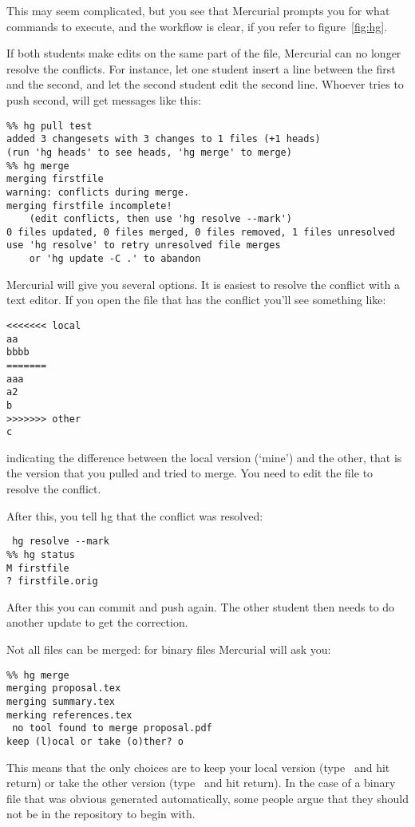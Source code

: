 This may seem complicated, but you see that Mercurial prompts you 
for what commands to execute, and the workflow is clear, if you refer
to figure~\ref{fig:hg}.


If both students make edits on the same part of the file, Mercurial can no
longer resolve the conflicts. For instance, let one student insert a
line between the first and the second, and let the second student edit
the second line. Whoever tries to push second, will get messages
like this:
{\small
\begin{verbatim}
%% hg pull test
added 3 changesets with 3 changes to 1 files (+1 heads)
(run 'hg heads' to see heads, 'hg merge' to merge)
%% hg merge
merging firstfile
warning: conflicts during merge.
merging firstfile incomplete! 
    (edit conflicts, then use 'hg resolve --mark')
0 files updated, 0 files merged, 0 files removed, 1 files unresolved
use 'hg resolve' to retry unresolved file merges 
    or 'hg update -C .' to abandon
\end{verbatim}
}
Mercurial will give you several options. It is easiest to resolve the
conflict with a text editor. If you open the file that has the conflict
you'll see something like:
\begin{verbatim}
<<<<<<< local
aa
bbbb
=======
aaa
a2
b
>>>>>>> other
c
\end{verbatim}
indicating the difference between the local version (`mine') and the
other, that is the version that you pulled and tried to merge.
You need to edit the file to resolve the conflict.

After this, you tell hg that the conflict was resolved:
\begin{verbatim}
 hg resolve --mark
%% hg status
M firstfile
? firstfile.orig
\end{verbatim}
After this you can commit and push again.
The other student then needs to do another update to get the
correction.

Not all files can be merged: for binary files Mercurial will ask you:
\begin{verbatim}
%% hg merge
merging proposal.tex
merging summary.tex
merking references.tex
 no tool found to merge proposal.pdf
keep (l)ocal or take (o)ther? o
\end{verbatim}
This means that the only choices are to keep your local version
(type~ and hit return) or take the other version (type~ and
hit return). In the case of a binary file that was obvious generated
automatically, some people argue that they should not be in the
repository to begin with.

